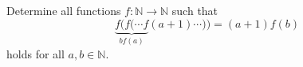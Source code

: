 Determine all functions $f\colon\mathbb{N} \rightarrow \mathbb{N}$ such that
$$\underbrace{f(f(\cdots f}_{bf(a)}(a+1)\cdots)) = (a+1)f(b)$$    
holds for all $a,b \in \mathbb{N}$.
